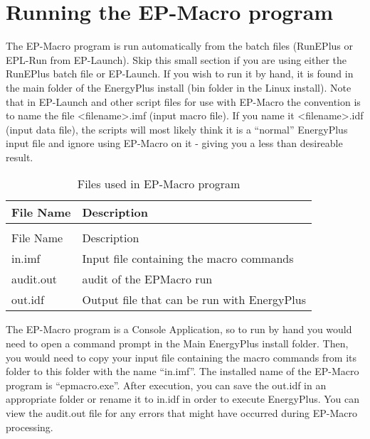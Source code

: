 \section{Running the EP-Macro program}\label{running-the-ep-macro-program}

The EP-Macro program is run automatically from the batch files (RunEPlus or EPL-Run from EP-Launch). Skip this small section if you are using either the RunEPlus batch file or EP-Launch. If you wish to run it by hand, it is found in the main folder of the EnergyPlus install (bin folder in the Linux install). Note that in EP-Launch and other script files for use with EP-Macro the convention is to name the file \textless{}filename\textgreater{}.imf (input macro file). If you name it \textless{}filename\textgreater{}.idf (input data file), the scripts will most likely think it is a ``normal'' EnergyPlus input file and ignore using EP-Macro on it - giving you a less than desireable result.

\begin{longtable}[c]{@{}ll@{}}
\caption{Files used in EP-Macro program \label{table:files-used-in-ep-macro-program}} \tabularnewline
\toprule 
File Name & Description \tabularnewline
\midrule
\endfirsthead

\caption[]{Files used in EP-Macro program} \tabularnewline
\toprule 
File Name & Description \tabularnewline
\midrule
\endhead

in.imf & Input file containing the macro commands \tabularnewline
audit.out & audit of the EPMacro run \tabularnewline
out.idf & Output file that can be run with EnergyPlus \tabularnewline
\bottomrule
\end{longtable}

The EP-Macro program is a Console Application, so to run by hand you would need to open a command prompt in the Main EnergyPlus install folder. Then, you would need to copy your input file containing the macro commands from its folder to this folder with the name ``in.imf''. The installed name of the EP-Macro program is ``epmacro.exe''. After execution, you can save the out.idf in an appropriate folder or rename it to in.idf in order to execute EnergyPlus. You can view the audit.out file for any errors that might have occurred during EP-Macro processing.
